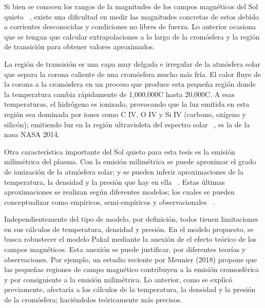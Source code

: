 Si bien se conocen los rangos de la magnitudes de los campos magn\'eticos del Sol quieto ~\citep{VAULT2}, existe una dificultad en medir las magnitudes concretas de estos debido a corrientes desconocidas y condiciones no libres de fuerza. Lo anterior ocasiona que se tengan que calcular extrapolaciones a lo largo de la crom\'osfera y la regi\'on de transici\'on para obtener valores aproximados. 

La región de transisión es una capa muy delgada e irregular de la atmósfera solar que separa la corona caliente de una cromósfera mucho más fría. El calor fluye de la corona a la cromósfera en un proceso que produce esta pequeña regi\'on donde la temperatura cambia rápidamente de 1,000,000C hasta 20,000C. A esas temperaturas, el hidrógeno es ionizado, provocando que la luz emitida en esta región sea dominada por iones como C IV, O IV y Si IV (carbono, oxígeno y silicón); emitiendo luz en la región ultravioleta del espectro solar ~\citep{NASAtr}, es la de la nasa NASA 2014.

Otra caracter\'istica importante del Sol quieto para esta tesis es la emisi\'on milim\'etrica del plasma. Con la emisi\'on milim\'etrica se puede aproximar el grado de ionizaci\'on de la atm\'osfera solar; y se pueden inferir aproximaciones de la temperatura, la densidad y la presi\'on que hay en ella ~\citep{millimeter}. Estas \'ultimas aproximaciones se realizan seg\'un diferentes modelos; los cuales se pueden conceptualizar como emp\'iricos, semi-emp\'iricos y observacionales ~\citep{2010ApJS..188..437D}.

Independientemente del tipo de modelo, por definici\'on, todos tienen limitaciones en sus c\'alculos de temperatura, densidad y presi\'on. En el modelo propuesto, se busca robustecer el modelo Pakal mediante la anexi\'on de el efecto te\'orico de los campos magn\'eticos. Esta anexi\'on se puede justificar, por diferentes teor\'ias y observaciones. Por ejemplo, un estudio reciente por Meunier (2018) propone que las peque\~nas regiones de campo magn\'etico contribuyen a la emisi\'on cromosf\'erica y por consiguiente a la emisi\'on milim\'etrica. Lo anterior, como se explic\'o previamente, afectar\'ia a los c\'alculos de la temperatura, la densidad y la presi\'on de la crom\'osfera; haci\'endolos te\'oricamente m\'as precisos.
